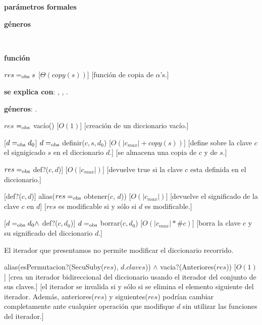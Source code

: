 \begin{Interfaz}

	\textbf{parámetros formales}\parindent\\
	\parbox{1.7cm}{\textbf{géneros}} \TipoVariable{$\alpha$}\\
	\parbox[t]{1.7cm}{\textbf{función}}\parbox[t]{\textwidth-2\parindent-1.7cm}{
		{$res =_{\mathrm{obs}} s$}
		[$\Theta(copy(s))$]
		[función de copia de $\alpha$'s.]
	}

	\textbf{se explica con}: , , .

	\textbf{géneros}: \TipoVariable{\dicString, \itDicString}.



	{$res$ $=_{\mathrm{obs}}$ vacío()}
	[$O(1)$]
	[creación de un diccionario vacío.]

	[$d =_{\mathrm{obs}} d_0$]
	{$d =_{\mathrm{obs}}$ definir($c, s, d_0$)}
	[$O(|c_{max}| + copy(s))$]
	[define sobre la clave $c$ el signigicado $s$ en el diccionario $d$.]
	[se almacena una copia de $c$ y de $s$.]

	{$res =_{\mathrm{obs}}$ def?($c, d$)]}
	[$O(|c_{max}|)$]
	[devuelve true si la clave $c$ esta definida en el diccionario.]

	[def?($c, d$)]
	{alias($res =_{\mathrm{obs}}$ obtener($c$, $d$))}
	[$O(|c_{max}|)$]
	[devuelve el significado de la clave $c$ en $d$]
	[$res$ es modificable si y sólo si $d$ es modificable.]

	[$d =_{\mathrm{obs}} d_0 \land$ def?($c, d_0$)]
	{$d =_{\mathrm{obs}}$ borrar($c, d_0$)}
	[$O(|c_{max}| * \#c)$]
	[borra la clave $c$ y su significado del diccionario $d$.]



	El iterador que presentamos no permite modificar el diccionario recorrido.

	{alias(esPermutacion?(SecuSuby($res$), $d.claves$)) $\land$ vacia?(Anteriores($res$))}
	[$O(1)$]
	[crea un iterador bidireccional del diccionario usando el iterador del conjunto de sus claves.]
	[el iterador se invalida si y sólo si se elimina el elemento siguiente del iterador. Además, anteriores($res$) y siguientes($res$) podrían cambiar completamente ante cualquier operación que modifique $d$ sin utilizar las funciones del iterador.]


\end{Interfaz}
